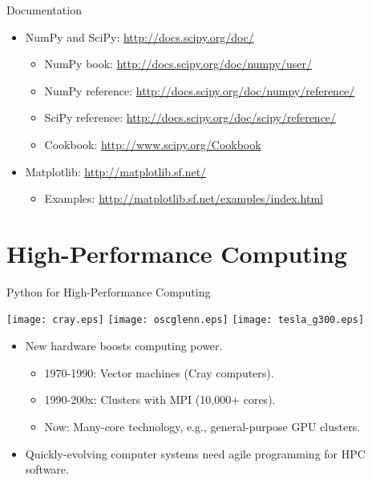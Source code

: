 \documentclass[dvips,xcolor=pst]{beamer}
\begin{document}
\begin{frame}{
%
Documentation
%
}
\begin{itemize} \large
  \item NumPy and SciPy: \url{http://docs.scipy.org/doc/}
  \begin{itemize} \large
    \item NumPy book: \url{http://docs.scipy.org/doc/numpy/user/}
    \item NumPy reference: \url{http://docs.scipy.org/doc/numpy/reference/}
    \item SciPy reference: \url{http://docs.scipy.org/doc/scipy/reference/}
    \item Cookbook: \url{http://www.scipy.org/Cookbook}
  \end{itemize}
  \item Matplotlib: \url{http://matplotlib.sf.net/}
  \begin{itemize} \large
    \item Examples: \url{http://matplotlib.sf.net/examples/index.html}
  \end{itemize}
\end{itemize}
\end{frame}

\section{
High-Performance Computing
}

\begin{frame}{
%
Python for High-Performance Computing
%
}
\begin{center}
  \texttt{[image: cray.eps]}
  \hspace{0.01\textwidth}
  \texttt{[image: oscglenn.eps]}
  \hspace{0.01\textwidth}
  \texttt{[image: tesla\_g300.eps]}
\end{center}
\begin{itemize}
  \item New hardware boosts computing power.
  \begin{itemize}
    \item 1970-1990: Vector machines (Cray computers).
    \item 1990-200x: Clusters with MPI (10,000+ cores).
    \item Now: Many-core technology, e.g., general-purpose GPU clusters.
  \end{itemize}
  \item Quickly-evolving computer systems need agile programming for HPC
  software.
\end{itemize}
\end{frame}
\end{document}
